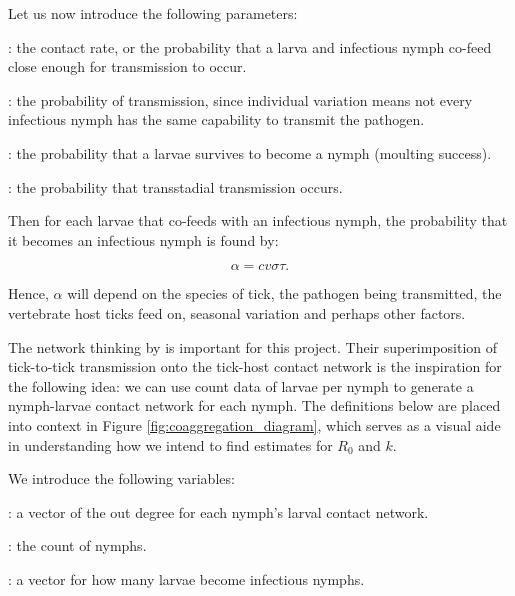 \documentclass[hidelinks]{article}
\begin{document}
Let us now introduce the following parameters:

\begin{description}[leftmargin=1cm, style=multiline]
    \item[$ c $] : the contact rate, or the probability that a larva and infectious nymph co-feed close enough for transmission to occur.
    \item[$ v $] : the probability of transmission, since individual variation means not every infectious nymph has the same capability to transmit the pathogen.
    \item[$ \sigma $] : the probability that a larvae survives to become a nymph (moulting success).
    \item[$ \tau $] : the probability that transstadial transmission occurs.
\end{description}

Then for each larvae that co-feeds with an infectious nymph, the probability that it becomes an infectious nymph is found by:

\begin{equation} \label{alphaDef}
    \alpha = c v \sigma \tau.
\end{equation}

Hence, $ \alpha $ will depend on the species of tick, the pathogen being transmitted, the vertebrate host ticks feed on, seasonal variation and perhaps other factors.

The network thinking by \citet{JohnstoneRobertson2020} is important for this project. Their superimposition of tick-to-tick transmission onto the tick-host contact network is the inspiration for the following idea: we can use count data of larvae per nymph to generate a nymph-larvae contact network for each nymph. The definitions below are placed into context in Figure \ref{fig:coaggregation_diagram}, which serves as a visual aide in understanding how we intend to find estimates for $ R_0 $ and $ k $.

We introduce the following variables:

\begin{description}[leftmargin=1cm, style=multiline]
    \item[$ X $] : a vector of the out degree for each nymph's larval contact network.
	\item[$ n $] : the count of nymphs.
    \item[$ Z $] : a vector for how many larvae become infectious nymphs. 
\end{description}
\end{document}

